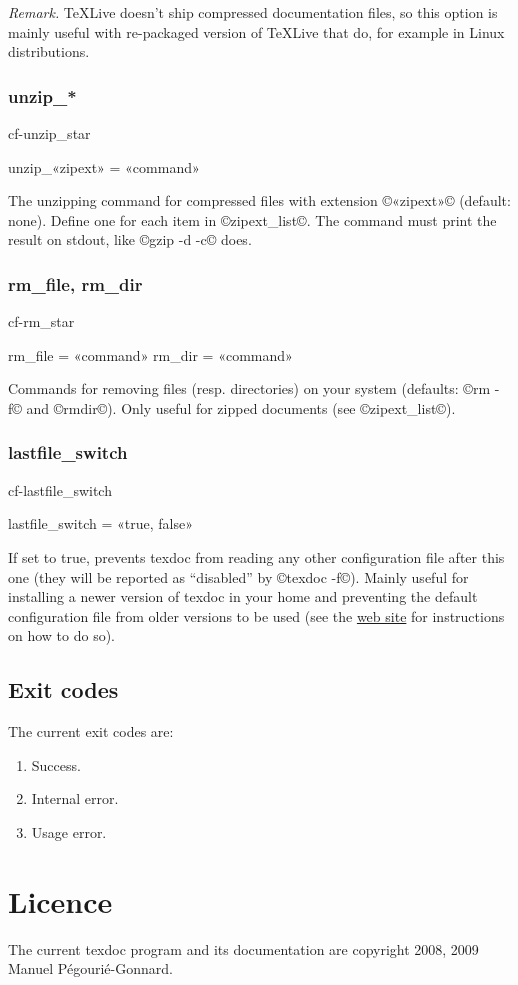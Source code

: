 \documentclass[a4paper, oneside]{scrartcl}
\newcommand\texlive{%
  \TeX\thinspace Live\xspace}
\newif\ifframed
\newenvironment{cmdsubsub}[2]{%
  \framedfalse \commandes\subsubsection{#1}{#2}%
  }{%
  \endcommandes}
\begin{document}
\textit{Remark.} \texlive doesn't ship compressed documentation files, so
this option is mainly useful with re-packaged version of \texlive that do,
for example in Linux distributions.

\begin{cmdsubsub}{unzip_*}{cf-unzip_star}
  unzip_«zipext» = «command»
\end{cmdsubsub}

The unzipping command for compressed files with extension ©«zipext»© (default:
none). Define one for each item in ©zipext_list©. The command must print
the result on stdout, like ©gzip -d -c© does.

\begin{cmdsubsub}{rm_file, rm_dir}{cf-rm_star}
  rm_file = «command»
  rm_dir  = «command»
\end{cmdsubsub}

Commands for removing files (resp. directories) on your system (defaults:
©rm -f© and ©rmdir©). Only useful for zipped documents (see ©zipext_list©).

\begin{cmdsubsub}{lastfile_switch}{cf-lastfile_switch}
  lastfile_switch = «true, false»
\end{cmdsubsub}

If set to true, prevents texdoc from reading any other configuration file
after this one (they will be reported as ``disabled'' by ©texdoc -f©).  Mainly
useful for installing a newer version of texdoc in your home and preventing
the default configuration file from older versions to be used (see the
\href{http://tug.org/texdoc/}{web site} for instructions on how to do so).

\subsection{Exit codes}\label{ss-exit}

The current exit codes are:
\begin{enumerate}[start=0]
  \item Success.
  \item Internal error.
  \item Usage error.
\end{enumerate}

\section{Licence}\label{s-licence}

The current texdoc program and its documentation are copyright 2008, 2009
Manuel Pégourié-Gonnard.
\end{document}
